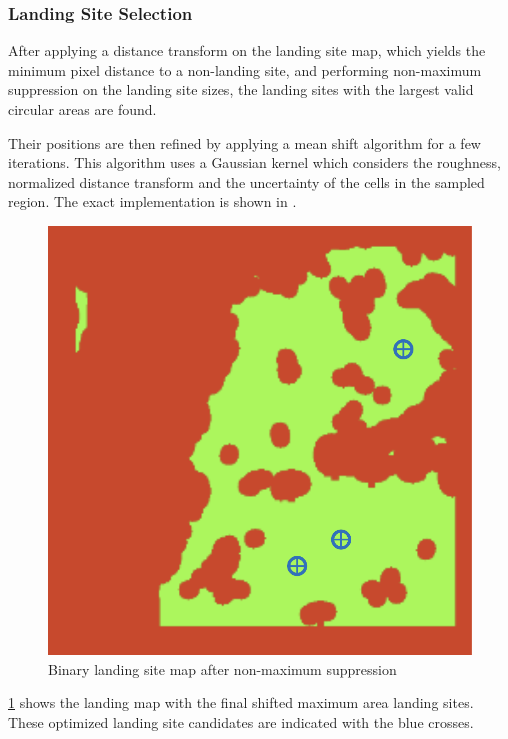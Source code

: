 \subsubsection{Landing Site Selection}\label{subsubsec:setup:ls_select}

After applying a distance transform on the landing site map, which yields the minimum pixel distance to a non-landing site, and performing non-maximum suppression on the landing site sizes, the landing sites with the largest valid circular areas are found. 


Their positions are then refined by applying a mean shift algorithm for a few iterations. This algorithm uses a Gaussian kernel which considers the roughness, normalized distance transform and the uncertainty of the cells in the sampled region. The exact implementation is shown in \citet{LSD2}.

\begin{figure}[ht!]
    \centering
    \includegraphics[scale=0.5]{images/system_overview/ls_map_nms.png}
    \caption{Binary landing site map after non-maximum suppression}
    \label{fig:ls_map_nps}
\end{figure}

\cref{fig:ls_map_nps} shows the landing map with the final shifted maximum area landing sites. These optimized landing site candidates are indicated with the blue crosses. 

